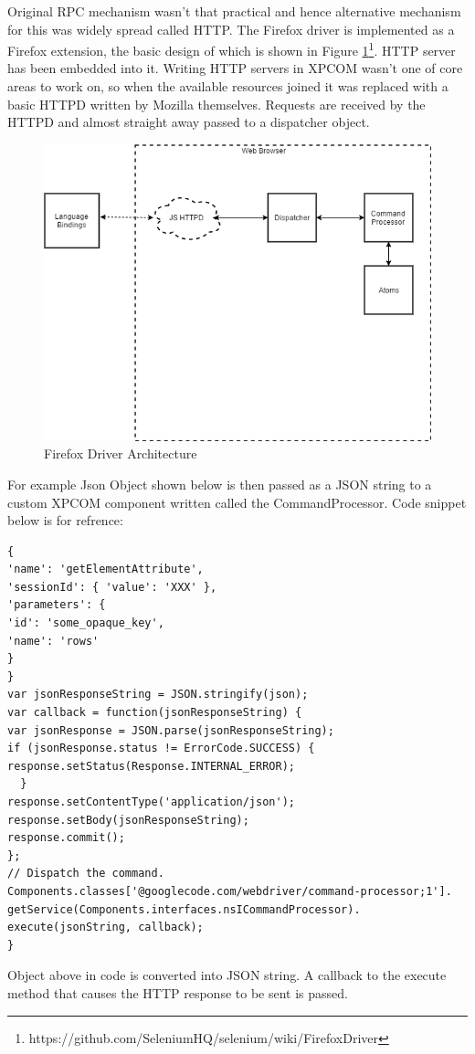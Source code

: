 \documentclass[article,type=msc,colorback,accentcolor=tud9c,twoside,11pt]{tudthesis}
\begin{document}
Original RPC mechanism wasn't that practical and hence alternative mechanism for this was widely spread called HTTP. The Firefox driver is implemented as a Firefox extension, the basic design of which is shown in Figure \ref{fig:Flowchart}\footnote{https://github.com/SeleniumHQ/selenium/wiki/FirefoxDriver}. HTTP server has been embedded into it. Writing HTTP servers in XPCOM wasn't one of core areas to work on, so when the available resources joined it was replaced with a basic HTTPD written by Mozilla themselves. Requests are received by the HTTPD and almost straight away passed to a dispatcher object.
\begin{figure}[h]
	\centering
	\includegraphics[scale=0.6]{SeleniumHttp.PNG}
	\caption{Firefox Driver Architecture}
	\label{fig:Flowchart}
\end{figure}
 For example Json Object shown below is then passed as a JSON string to a custom XPCOM component written called the CommandProcessor. Code snippet below is for refrence:
\begin{lstlisting}
{
'name': 'getElementAttribute',
'sessionId': { 'value': 'XXX' },
'parameters': {
'id': 'some_opaque_key',
'name': 'rows'
}
}
var jsonResponseString = JSON.stringify(json);
var callback = function(jsonResponseString) {
var jsonResponse = JSON.parse(jsonResponseString);
if (jsonResponse.status != ErrorCode.SUCCESS) {
response.setStatus(Response.INTERNAL_ERROR);
  }
response.setContentType('application/json');
response.setBody(jsonResponseString);
response.commit();
};
// Dispatch the command.
Components.classes['@googlecode.com/webdriver/command-processor;1'].
getService(Components.interfaces.nsICommandProcessor).
execute(jsonString, callback);
}
\end{lstlisting}
Object above in code is converted into JSON string. A callback to the execute method that causes the HTTP response to be sent is passed.
\end{document}
